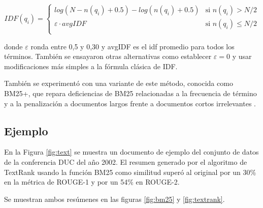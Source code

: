 \documentclass[a4paper]{article}
\begin{document}
\begin{equation}
 IDF(q_i) =
  \begin{cases}
       log(N - n(q_i) + 0.5) - log(n(q_i) + 0.5)    & \text{si }  n(q_i) > N/2\\
       \varepsilon \cdot avgIDF                     & \text{si }  n(q_i) \leq N/2\\
  \end{cases}
\end{equation}                
                
donde $\varepsilon$ ronda entre 0,5 y 0,30 y avgIDF es el idf promedio para todos los términos.
También se ensayaron otras alternativas como establecer $\varepsilon = 0$ y usar modificaciones más simples a la fórmula clásica de IDF.

También se experimentó con una variante de este método, conocida como BM25+, que repara deficiencias de BM25 relacionadas a la frecuencia de término y a la penalización a documentos largos frente a documentos cortos irrelevantes \cite{lv}.

\subsection{Ejemplo}
En la Figura \ref{fig:text} se muestra un documento de ejemplo del conjunto de datos de la conferencia DUC del año 2002.
El resumen generado por el algoritmo de TextRank usando la función BM25 como similitud superó al original por un 30\% en la métrica de ROUGE-1 y por un 54\% en ROUGE-2.

Se muestran ambos resúmenes en las figuras \ref{fig:bm25} y \ref{fig:textrank}.
\end{document}

